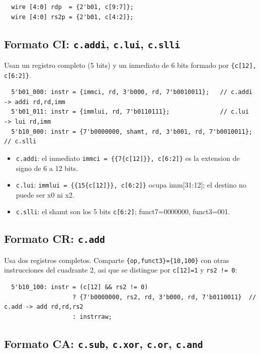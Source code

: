 \documentclass[11pt,a4paper]{article}
\begin{document}
\begin{lstlisting}
  wire [4:0] rdp  = {2'b01, c[9:7]};
  wire [4:0] rs2p = {2'b01, c[4:2]};
\end{lstlisting}

\subsection{Formato CI: \texttt{c.addi}, \texttt{c.lui}, \texttt{c.slli}}

Usan un registro completo (5 bits) y un inmediato de 6 bits formado por
\texttt{\{c[12], c[6:2]\}}.

\begin{lstlisting}
  5'b01_000: instr = {immci, rd, 3'b000, rd, 7'b0010011};   // c.addi -> addi rd,rd,imm
  5'b01_011: instr = {immlui, rd, 7'b0110111};              // c.lui  -> lui rd,imm
  5'b10_000: instr = {7'b0000000, shamt, rd, 3'b001, rd, 7'b0010011}; // c.slli
\end{lstlisting}

\begin{itemize}[noitemsep]
  \item \texttt{c.addi}: el inmediato \texttt{immci = \{\{7\{c[12]\}\}, c[6:2]\}}
        es la extension de signo de 6 a 12 bits.
  \item \texttt{c.lui}: \texttt{immlui = \{\{15\{c[12]\}\}, c[6:2]\}} ocupa
        imm[31:12]; el destino no puede ser x0 ni x2.
  \item \texttt{c.slli}: el shamt son los 5 bits \texttt{c[6:2]}; funct7=0000000,
        funct3=001.
\end{itemize}

\subsection{Formato CR: \texttt{c.add}}

Usa dos registros completos. Comparte \texttt{\{op,funct3\}=\{10,100\}} con otras
instrucciones del cuadrante 2, asi que se distingue por \texttt{c[12]=1} y
\texttt{rs2 != 0}:

\begin{lstlisting}
  5'b10_100: instr = (c[12] && rs2 != 0)
                   ? {7'b0000000, rs2, rd, 3'b000, rd, 7'b0110011}  // c.add -> add rd,rd,rs2
                   : instrraw;
\end{lstlisting}

\subsection{Formato CA: \texttt{c.sub}, \texttt{c.xor}, \texttt{c.or}, \texttt{c.and}}
\end{document}

